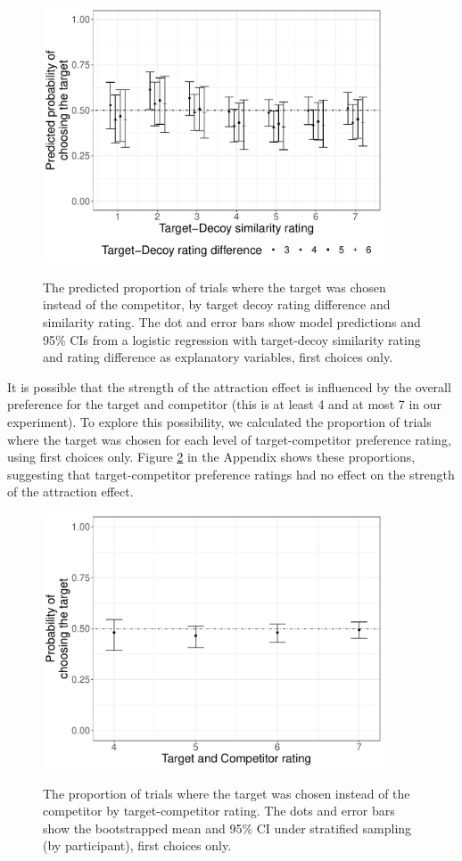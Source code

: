 \documentclass[12pt, a4paper]{article}
\begin{document}
\begin{figure}[htb!]
\centering
		\caption{The predicted proportion of trials where the target was chosen instead of the competitor, by target decoy rating difference and similarity rating. The dot and error bars show model predictions and 95\% CIs from a logistic regression with target-decoy similarity rating and rating difference as explanatory variables, first choices only.}
\includegraphics[width=0.9\textwidth]{figure6.pdf}
\label{fig:exp2_res}
\end{figure}

It is possible that the strength of the attraction effect is influenced by the overall preference for the target and competitor (this is at least 4 and at most 7 in our experiment). To explore this possibility, we calculated the proportion of trials where the target was chosen for each level of target-competitor preference rating, using first choices only. Figure \ref{fig:exp2_res} in the Appendix shows these proportions, suggesting that target-competitor preference ratings had no effect on the strength of the attraction effect. 




\begin{figure}[htb!]
\centering
		\caption{The proportion of trials where the target was chosen instead of the competitor by target-competitor rating. The dots and error bars show the bootstrapped mean and 95\% CI under stratified sampling (by participant), first choices only.}
\includegraphics[width=0.9\textwidth]{figure7.pdf}
\label{fig:exp2_res}
\end{figure}
\end{document}

